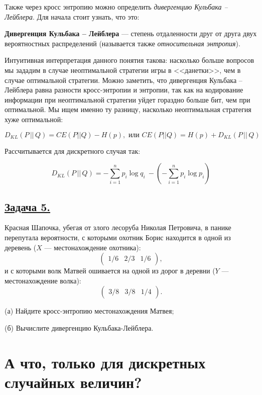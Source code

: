 Также через кросс энтропию можно определить \textit{дивергенцию Кульбака -- Лейблера}. Для начала стоит узнать, что это:

\begin{siderules}
    \textbf{Дивергенция Кульбака -- Лейблера} --- степень отдаленности друг от друга двух вероятностных распределений (называется также \textit{относительная энтропия}). \end{siderules}
    
    Интуитивная интерпретация данного понятия такова: насколько больше вопросов мы зададим в случае неоптимальной стратегии игры в <<данетки>>, чем в случае оптимальной стратегии. Можно заметить, что дивергенция Кульбака -- Лейблера равна разности кросс-энтропии и энтропии, так как на кодирование информации при неоптимальной стратегии уйдет гораздно больше бит, чем при оптимальной. Мы ищем именно ту разницу, насколько неоптимальная стратегия хуже оптимальной: 
    
    \[D_{KL}(P\, ||\, Q)= CE(P||Q) - H(p), \text{ или } CE(P||Q)=H(p)+D_{KL}(P\, || \, Q)\]
    
    Рассчитывается для дискретного случая так:

    \[D_{KL}(P\, ||\, Q)=  - \sum\limits_{i=1}^n p_i\log q_i\ - ( - \sum\limits_{i=1}^n p_i\log p_i)\]



\subsection*{\hyperref[sec:sol_problem5]{Задача 5.}}\label{sec:problem5} Красная Шапочка, убегая от злого лесоруба Николая Петровича, в панике перепутала вероятности, с которыми охотник Борис находится в одной из деревень ($X$ --- местонахождение охотника):
\[\begin{pmatrix}
    1/6 & 2/3 & 1/6
\end{pmatrix} , \] и с которыми волк Матвей ошивается на одной из дорог в деревни ($Y$ --- местонахождение волка):
\[\begin{pmatrix}
    3/8 & 3/8 & 1/4 
\end{pmatrix} .\]

(а) Найдите кросс-энтропию местонахождения Матвея;

(б) Вычислите дивергенцию Кульбака-Лейблера.

\section*{А что, только для дискретных случайных величин?}~\
\\

